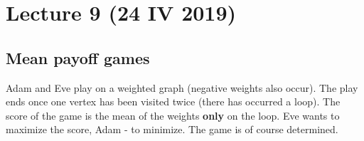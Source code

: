 \section{Lecture 9 (24 IV 2019)}
\subsection*{Mean payoff games}
Adam and Eve play on a weighted graph (negative weights also occur). The play ends
once one vertex has been visited twice (there has occurred a loop). The score of the
game is the mean of the weights \textbf{only} on the loop. Eve wants to maximize the
score, Adam - to minimize. The game is of course determined.